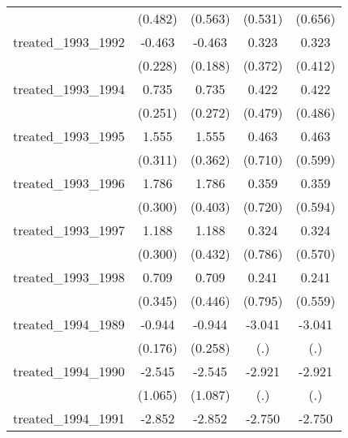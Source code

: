 {\begin{tabular}{l*{4}{c}}
            &     (0.482)         &     (0.563)         &     (0.531)         &     (0.656)         \\
[1em]
treated\_1993\_1992&      -0.463\sym{*}  &      -0.463\sym{*}  &       0.323         &       0.323         \\
            &     (0.228)         &     (0.188)         &     (0.372)         &     (0.412)         \\
[1em]
treated\_1993\_1994&       0.735\sym{**} &       0.735\sym{**} &       0.422         &       0.422         \\
            &     (0.251)         &     (0.272)         &     (0.479)         &     (0.486)         \\
[1em]
treated\_1993\_1995&       1.555\sym{***}&       1.555\sym{***}&       0.463         &       0.463         \\
            &     (0.311)         &     (0.362)         &     (0.710)         &     (0.599)         \\
[1em]
treated\_1993\_1996&       1.786\sym{***}&       1.786\sym{***}&       0.359         &       0.359         \\
            &     (0.300)         &     (0.403)         &     (0.720)         &     (0.594)         \\
[1em]
treated\_1993\_1997&       1.188\sym{***}&       1.188\sym{**} &       0.324         &       0.324         \\
            &     (0.300)         &     (0.432)         &     (0.786)         &     (0.570)         \\
[1em]
treated\_1993\_1998&       0.709\sym{*}  &       0.709         &       0.241         &       0.241         \\
            &     (0.345)         &     (0.446)         &     (0.795)         &     (0.559)         \\
[1em]
treated\_1994\_1989&      -0.944\sym{***}&      -0.944\sym{***}&      -3.041         &      -3.041         \\
            &     (0.176)         &     (0.258)         &         (.)         &         (.)         \\
[1em]
treated\_1994\_1990&      -2.545\sym{*}  &      -2.545\sym{*}  &      -2.921         &      -2.921         \\
            &     (1.065)         &     (1.087)         &         (.)         &         (.)         \\
[1em]
treated\_1994\_1991&      -2.852\sym{***}&      -2.852\sym{***}&      -2.750\sym{***}&      -2.750\sym{***}\\

\end{tabular}}
